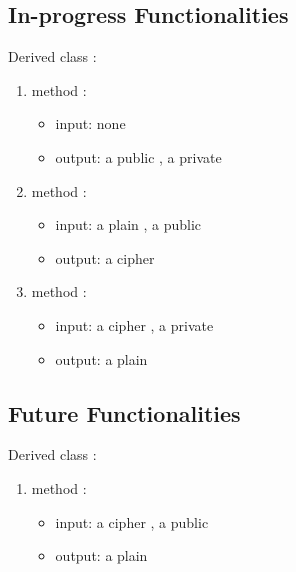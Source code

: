 
\subsection{In-progress Functionalities}

Derived class :
\begin{enumerate}
\item method :
  \begin{itemize}
  \item input: none
  \item output: a public , a private 
  \end{itemize}
\item method :
  \begin{itemize}
  \item input: a plain , a public 
  \item output: a cipher 
  \end{itemize}
\item method :
  \begin{itemize}
  \item input: a cipher , a private 
  \item output: a plain 
  \end{itemize}
\end{enumerate}


\subsection{Future Functionalities}

Derived class :
\begin{enumerate}
\item method :
  \begin{itemize}
  \item input: a cipher , a public 
  \item output: a plain 
  \end{itemize}
\end{enumerate}
